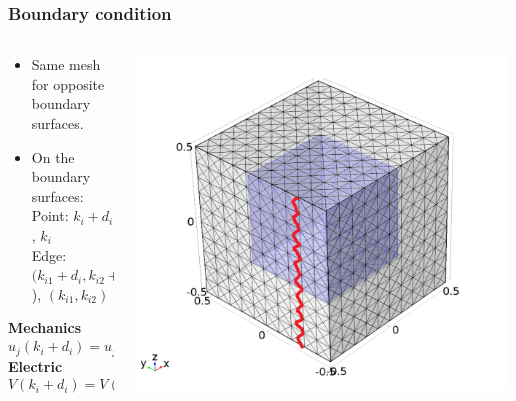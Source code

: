 \documentclass[compress]{beamer}
\begin{document}
\begin{frame}\frametitle{Boundary condition}
\begin{columns}[totalwidth=\textwidth]
   \begin{column}{.51\textwidth}
   \begin{itemize}[label=$\bullet$, font=\small, leftmargin=*]
	\item Same mesh for opposite boundary surfaces.
	\item On the boundary surfaces: \\
	Point: $k_i + d_i$, $k_i$ \\
	Edge: $(k_{i1}+d_i,k_{i2}+d_i$), $(k_{i1},k_{i2})$
	\end{itemize}
\textbf{Mechanics}\vspace*{-\baselineskip}
\begin{equation*}
u_j(k_i+d_i) = u_j(k_i)+\bar{S}_{ij}d_i
\end{equation*}
\textbf{Electric}\vspace*{-\baselineskip}
\begin{equation*}
V(k_i+d_i) = V(k_i)+\bar{E}_{i}d_i
\end{equation*}
   \end{column}
   \begin{column}{.49\textwidth}
   \includegraphics[width=0.99\textwidth]{Graphic/04_meshperiocondi.pdf}
   \end{column}
\end{columns}

\end{frame}
\end{document}
